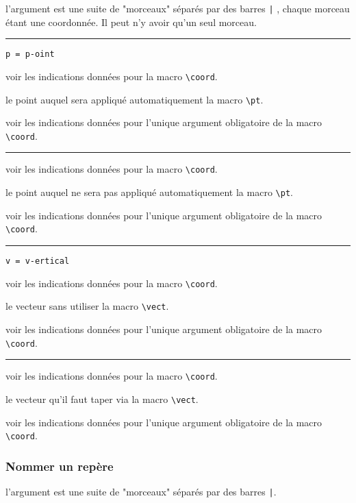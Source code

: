 \documentclass[12pt,a4paper]{article}
\newcommand\env[1]{\texttt{#1}}
\newcommand\macro[1]{\env{\textbackslash{}#1}}
\theoremstyle{definition}
\newcommand\separation{
	\medskip
	\hfill\rule{0.5\textwidth}{0.75pt}\hfill
	\medskip
}
\newcommand\mwhyprefix[2]{%
	\texttt{#1 = #1-#2}%
}
\begin{document}
\IDarg{} l'argument est une suite de "morceaux" séparés par des barres \verb+|+ , chaque morceau étant une coordonnée. Il peut n'y avoir qu'un seul morceau.


\separation


  \hfill \mwhyprefix{p}{oint}

\IDoption{} voir les indications données pour la macro \macro{coord}.

 le point auquel sera appliqué automatiquement la macro \macro{pt}.

 voir les indications données pour l'unique argument obligatoire de la macro \macro{coord}.


\separation



\IDoption{} voir les indications données pour la macro \macro{coord}.

 le point auquel ne sera pas appliqué automatiquement la macro \macro{pt}.

 voir les indications données pour l'unique argument obligatoire de la macro \macro{coord}.


\separation


 \hfill \mwhyprefix{v}{ertical}

\IDoption{} voir les indications données pour la macro \macro{coord}.

 le vecteur sans utiliser la macro \macro{vect}.

 voir les indications données pour l'unique argument obligatoire de la macro \macro{coord}.


\separation



\IDoption{} voir les indications données pour la macro \macro{coord}.

 le vecteur qu'il faut taper via la macro \macro{vect}.

 voir les indications données pour l'unique argument obligatoire de la macro \macro{coord}.


\subsubsection{Nommer un repère}





\IDarg{} l'argument est une suite de "morceaux" séparés par des barres \verb+|+.
\end{document}
